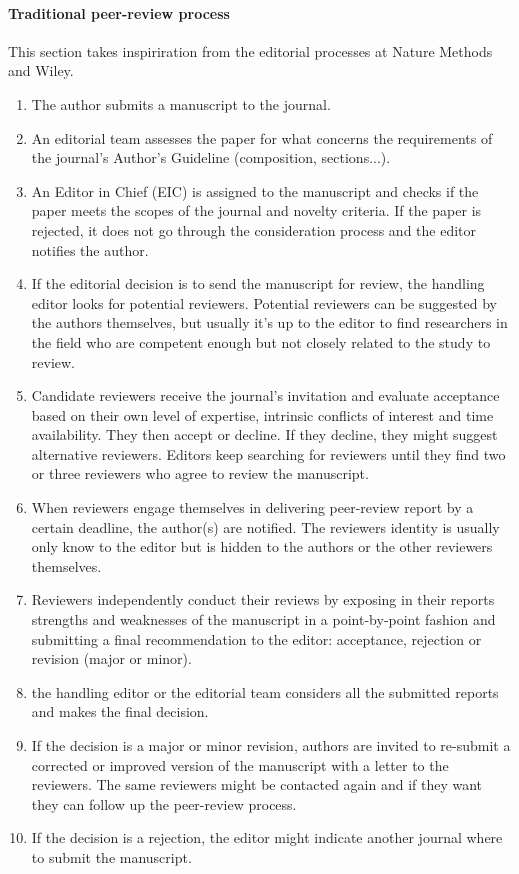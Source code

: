 \documentclass[runningheads]{llncs}
\begin{document}
\paragraph{Traditional peer-review process} This section takes inspiriration from the editorial processes at Nature Methods and Wiley.
\begin{enumerate}
    \item The author submits a manuscript to the journal.
    \item  An editorial team  assesses the paper for what concerns the requirements of the journal's Author's Guideline (composition, sections...).
    \item An Editor in Chief (EIC) is assigned to the manuscript and checks if the paper meets the scopes of the journal and novelty criteria. If the paper is rejected, it does not go through the consideration process and the editor notifies the author.
    \item If the editorial decision is to send the manuscript for review, the handling editor looks for potential reviewers. Potential reviewers can be suggested by the authors themselves, but usually it's up to the editor to find researchers in the field who are competent enough but not closely related to the study to review.
    \item Candidate reviewers receive the journal's invitation and evaluate acceptance based on their own level of expertise, intrinsic conﬂicts of interest and time availability. They then accept or decline. If they decline, they might suggest alternative reviewers. Editors keep searching for reviewers until they find two or three reviewers who agree to review the manuscript.
    \item When reviewers engage themselves in delivering peer-review report by a certain deadline, the author(s) are notified. The reviewers identity is usually only know to the editor but is hidden to the authors or the other reviewers themselves.
    \item Reviewers independently conduct their reviews by exposing in their reports strengths and weaknesses of the manuscript in a point-by-point fashion and submitting a final recommendation to the editor: acceptance, rejection or revision (major or minor).
    \item the handling editor or the editorial team considers all the submitted reports and makes the final decision.
    \item If the decision is a major or minor revision, authors are invited to re-submit a corrected or improved version of the manuscript with a letter to the reviewers. The same reviewers might be contacted again and if they want they can follow up the peer-review process.
    \item If the decision is a rejection, the editor might indicate another journal where to submit the manuscript.

\end{enumerate}
\end{document}
